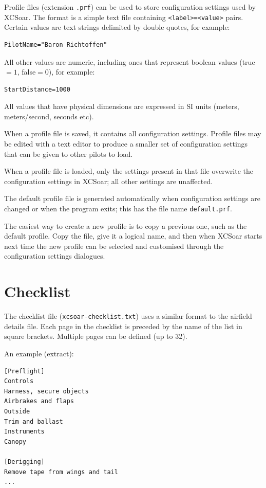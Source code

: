 Profile files (extension \verb|.prf|) can be used to store
configuration settings used by XCSoar.  The format is a simple text
file containing \verb|<label>=<value>| pairs.  Certain values are text
strings delimited by double quotes, for example:
\begin{verbatim}
PilotName="Baron Richtoffen"
\end{verbatim}
All other values are numeric, including ones that represent boolean
values (true$=1$, false$=0$), for example:
\begin{verbatim}
StartDistance=1000
\end{verbatim}

All values that have physical dimensions are expressed in SI units
(meters, meters/second, seconds etc).

When a profile file is saved, it contains all configuration settings.
Profile files may be edited with a text editor to produce a smaller
set of configuration settings that can be given to other pilots to
load.  

When a profile file is loaded, only the settings present in that file
overwrite the configuration settings in XCSoar; all other settings are
unaffected.

The default profile file is generated automatically when configuration
settings are changed or when the program exits; this has the
file name \verb|default.prf|.

The easiest way to create a new profile is to copy a previous one,
such as the default profile.  Copy the file, give it a logical name,
and then when XCSoar starts next time the new profile can be selected
and customised through the configuration settings dialogues.


\section{Checklist}\label{sec:checklist-file}

The checklist file (\verb|xcsoar-checklist.txt|) uses a similar format to
the airfield details file.  Each page in the checklist is preceded by
the name of the list in square brackets.  Multiple pages can be
defined (up to 32).

An example (extract):
\begin{verbatim}
[Preflight]
Controls
Harness, secure objects
Airbrakes and flaps
Outside
Trim and ballast
Instruments
Canopy

[Derigging]
Remove tape from wings and tail
...
\end{verbatim}

